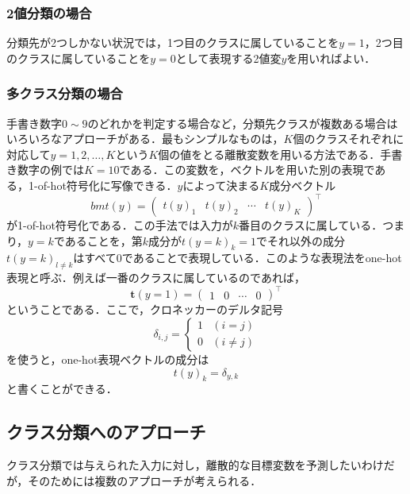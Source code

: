 \documentclass[a4paper,11pt]{jsreport}
\begin{document}
\subsubsection*{2値分類の場合}
分類先が2つしかない状況では，1つ目のクラスに属していることを$y=1$，2つ目のクラスに属していることを$y=0$として表現する2値変$y$を用いればよい．
\subsubsection*{多クラス分類の場合}
手書き数字$0 \sim 9$のどれかを判定する場合など，分類先クラスが複数ある場合はいろいろなアプローチがある．最もシンプルなものは，$K$個のクラスそれぞれに対応して$y = 1, 2, \dots, K$という$K$個の値をとる離散変数を用いる方法である．手書き数字の例では$K = 10$である．この変数を，ベクトルを用いた別の表現である，1-of-hot符号化に写像できる．$y$によって決まる$K$成分ベクトル
\begin{equation}
  bm{t}(y) = \begin{pmatrix}
    t(y)_1 & t(y)_2 & \cdots & t(y)_K
  \end{pmatrix}^{\top}
\end{equation}
が1-of-hot符号化である．この手法では入力が$k$番目のクラスに属している．つまり，$y=k$であることを，第$k$成分が$t(y=k)_{k} = 1$でそれ以外の成分$t(y=k)_{l \neq k}$はすべて0であることで表現している．このような表現法をone-hot表現と呼ぶ．例えば一番のクラスに属しているのであれば，
\begin{equation}
  \bm{t}(y=1) = \begin{pmatrix}
    1 & 0 & \cdots & 0
  \end{pmatrix}^{\top}
\end{equation}
ということである．ここで，クロネッカーのデルタ記号
\begin{equation}
  \delta_{i, j} 
  = \begin{cases}
    1 & (i = j) \\
    0 & (i \neq j)
  \end{cases}
\end{equation}
を使うと，one-hot表現ベクトルの成分は
\begin{equation}
  t(y)_k = \delta_{y, k}
\end{equation}
と書くことができる．

\subsection{クラス分類へのアプローチ}
クラス分類では与えられた入力に対し，離散的な目標変数を予測したいわけだが，そのためには複数のアプローチが考えられる．
\end{document}
